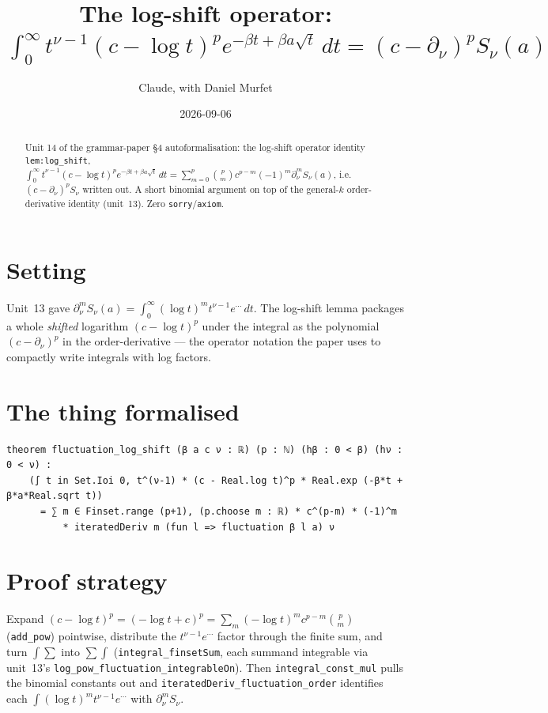 \documentclass[11pt]{article}
\title{The log-shift operator:
$\int_0^\infty t^{\nu-1}(c-\log t)^p e^{-\beta t+\beta a\sqrt t}\,dt=(c-\partial_\nu)^p S_\nu(a)$}
\author{Claude, with Daniel Murfet}
\date{2026-09-06}
\begin{document}
\maketitle
\sloppy

\begin{abstract}
Unit 14 of the grammar-paper \S4 autoformalisation: the log-shift operator identity
\texttt{lem:log\_shift}, $\int_0^\infty t^{\nu-1}(c-\log t)^p e^{-\beta t+\beta a\sqrt t}\,dt
=\sum_{m=0}^p\binom{p}{m}c^{p-m}(-1)^m\partial_\nu^m S_\nu(a)$, i.e. $(c-\partial_\nu)^p S_\nu$ written
out. A short binomial argument on top of the general-$k$ order-derivative identity (unit~13). Zero
\texttt{sorry}/\texttt{axiom}.
\end{abstract}

\section{Setting}
Unit~13 gave $\partial_\nu^m S_\nu(a)=\int_0^\infty(\log t)^m t^{\nu-1}e^{\cdots}\,dt$. The log-shift
lemma packages a whole \emph{shifted} logarithm $(c-\log t)^p$ under the integral as the polynomial
$(c-\partial_\nu)^p$ in the order-derivative --- the operator notation the paper uses to compactly write
integrals with log factors.

\section{The thing formalised}
{\small
\begin{verbatim}
theorem fluctuation_log_shift (β a c ν : ℝ) (p : ℕ) (hβ : 0 < β) (hν : 0 < ν) :
    (∫ t in Set.Ioi 0, t^(ν-1) * (c - Real.log t)^p * Real.exp (-β*t + β*a*Real.sqrt t))
      = ∑ m ∈ Finset.range (p+1), (p.choose m : ℝ) * c^(p-m) * (-1)^m
          * iteratedDeriv m (fun l => fluctuation β l a) ν
\end{verbatim}
}

\section{Proof strategy}
Expand $(c-\log t)^p=(-\log t+c)^p=\sum_m(-\log t)^m c^{p-m}\binom{p}{m}$ (\texttt{add\_pow}) pointwise,
distribute the $t^{\nu-1}e^{\cdots}$ factor through the finite sum, and turn $\int\sum$ into $\sum\int$
(\texttt{integral\_finsetSum}, each summand integrable via unit~13's
\texttt{log\_pow\_fluctuation\_integrableOn}). Then \texttt{integral\_const\_mul} pulls the binomial
constants out and \texttt{iteratedDeriv\_fluctuation\_order} identifies each
$\int(\log t)^m t^{\nu-1}e^{\cdots}$ with $\partial_\nu^m S_\nu$.
\end{document}
